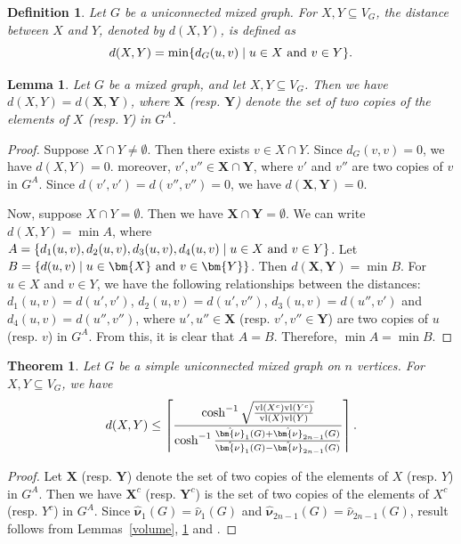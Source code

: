 \documentclass[12pt]{article}
\numberwithin{equation}{section}
\newtheorem{thm}{Theorem}[section]
\newtheorem{defn}{Definition}[section]
\newtheorem{lemma}{Lemma}[section]
\begin{document}
	\begin{defn}\normalfont
		Let $G$ be a uniconnected mixed graph. 
		For $X,Y\subseteq V_G$, the \textit{distance between $X$ and $Y$}, denoted by $d(X,Y)$, is defined as $$d(X,Y)=\min\{d_G(u,v)\mid u\in X\textnormal{ and }v\in Y\}.$$
	\end{defn}
	\begin{lemma}\label{distancelemma}
		Let $G$ be a mixed graph, and let $X,Y\subseteq V_G$. Then we have $d(X,Y)=d(\bm{X},\bm{Y})$, where $\bm{X}$ (resp. $\bm{Y}$) denote the set of two copies of the elements of $X$ (resp. $Y$) in $G^A$.
	\end{lemma}
	\begin{proof}
		Suppose $X\cap Y\neq \emptyset$. Then there exists $v\in X\cap Y$. Since $d_G(v,v)=0$, we have $d(X,Y)=0$. moreover, $v',v''\in \bm{X}\cap \bm{Y}$, where $v'$ and $v''$ are two copies of $v$ in $G^A$. Since $d(v',v')=d(v'',v'')=0$, we have $d(\bm{X},\bm{Y})=0$. 
		
		Now, suppose $X\cap Y= \emptyset$. Then we have $\bm{X}\cap \bm{Y}= \emptyset$. We can write $d(X,Y)=\min A$, where $A=\{d_1(u,v),d_2(u,v),d_3(u,v),d_4(u,v)\mid u\in X\textnormal{ and }v\in Y\}$. Let $B=\{d(u,v)\mid u\in \bm{X}\textnormal{ and }v\in \bm{Y}\}$. Then $d(\bm{X},\bm{Y})=\min B$.  
		For $u\in X$ and $v\in Y$, we have the following relationships between the distances: $d_1(u,v)=d(u',v')$, $d_2(u,v)=d(u',v'')$, $d_3(u,v)=d(u'',v')$ and $d_4(u,v)=d(u'',v'')$, where $u',u''\in\bm{X}$ (resp. $v',v''\in\bm{Y}$) are two copies of $u$ (resp. $v$) in $G^A$. From this, it is clear that $A=B$. Therefore,  $\min A=\min B$. 	
	\end{proof}
	\begin{thm}
		Let $G$ be a simple uniconnected mixed graph on $n$ vertices. For $X,Y\subseteq V_G$, we have 
		$$d(X,Y)\leq \left\lceil\frac{\cosh^{-1} \sqrt{\frac{\textnormal{vl}(X^c)\textnormal{vl}(Y^c)}{\textnormal{vl}(X)\textnormal{vl}(Y)}}}{\cosh^{-1} \frac{\hat{\bm{\nu}}_{1}(G)+\hat{\bm{\nu}}_{2n-1}(G)}{\hat{\bm{\nu}}_{1}(G)-\hat{\bm{\nu}}_{2n-1}(G)}}\right\rceil.$$
	\end{thm}
	\begin{proof}
		Let $\bm{X}$ (resp. $\bm{Y}$) denote the set of two copies of the elements of $X$ (resp. $Y$) in $G^A$. 
		Then we have $\bm{X}^c$ (resp. $\bm{Y}^c$) is the set of two copies of the elements of $X^c$ (resp. $Y^c$) in $G^A$.
		Since $\hat{\bm{\nu}}_1(G)=\hat{\nu}_1(G)$ and $\hat{\bm{\nu}}_{2n-1}(G)=\hat{\nu}_{2n-1}(G)$, result follows from Lemmas~\ref{volume}, \ref{distancelemma} and	\cite[Theorem~3.3]{chung}.
	\end{proof}
	
\end{document}
